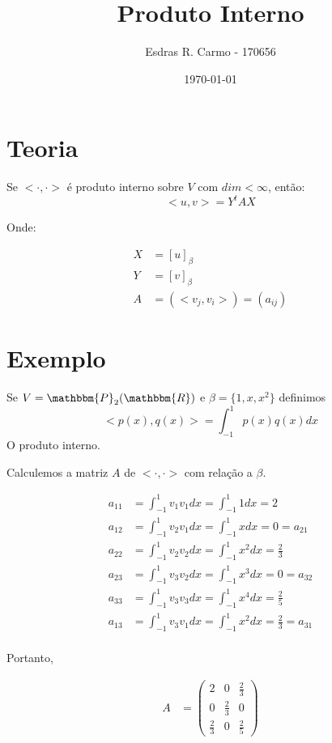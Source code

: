 \documentclass{article}
\author{Esdras R. Carmo - 170656}
\title{Produto Interno}
\date{\today}
\newcommand{\REAL} {\mathbbm{R}}
\newcommand{\POL}[1] {\mathbbm{P}_{#1} (\REAL)}
\newcommand{\interno}[0] {<\cdot, \cdot>}
\begin{document}
    \maketitle

    \section{Teoria}
        Se $\interno$ é produto interno sobre $V$ com $dim < \infty$, então:
        \[
            <u, v> = Y^t A X
        \]

        Onde:

        \begin{align*}
            X &= [u]_\beta\\
            Y &= [v]_\beta\\
            A &= (<v_j, v_i>) = (a_{ij})
        \end{align*}

    \section{Exemplo}
        Se $V = \POL{2}$ e $\beta = \{1, x, x^2\}$ definimos
        \[
            <p(x), q(x)> = \int_{-1}^1 p(x)q(x) dx
        \]
        O produto interno.

        Calculemos a matriz $A$ de $\interno$ com relação a $\beta$.

        \begin{align*}
            a_{11} &= \int_{-1}^1 v_1 v_1 dx = \int_{-1}^1 1 dx = 2\\
            a_{12} &= \int_{-1}^1 v_2 v_1 dx = \int_{-1}^1 x dx = 0 = a_{21}\\
            a_{22} &= \int_{-1}^1 v_2 v_2 dx = \int_{-1}^1 x^2 dx = \frac{2}{3}\\
            a_{23} &= \int_{-1}^1 v_3 v_2 dx = \int_{-1}^1 x^3 dx = 0 = a_{32}\\
            a_{33} &= \int_{-1}^1 v_3 v_3 dx = \int_{-1}^1 x^4 dx = \frac{2}{5}\\
            a_{13} &= \int_{-1}^1 v_3 v_1 dx = \int_{-1}^1 x^2 dx = \frac{2}{3} = a_{31}\\
        \end{align*}

        Portanto,

        \begin{align*}
            A &= 
            \begin{pmatrix}
                2 & 0 & \frac{2}{3}\\
                0 & \frac{2}{3} & 0\\
                \frac{2}{3} & 0 & \frac{2}{5}
            \end{pmatrix}
        \end{align*}
\end{document}
